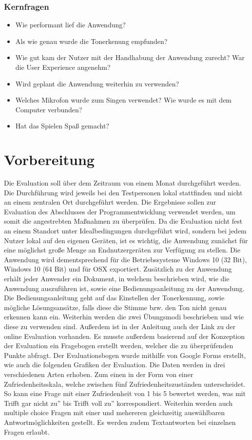 \subsubsection*{Kernfragen}
\begin{itemize}
    \item Wie performant lief die Anwendung?
    \item Als wie genau wurde die Tonerkenung empfunden?
    \item Wie gut kam der Nutzer mit der Handhabung der Anwendung zurecht? War die User Experience angenehm?
    \item Wird geplant die Anwendung weiterhin zu verwenden?
    \item Welches Mikrofon wurde zum Singen verwendet? Wie wurde es mit dem Computer verbunden?
    \item Hat das Spielen Spaß gemacht?
\end{itemize}

\section{Vorbereitung}
Die Evaluation soll über dem Zeitraum von einem Monat durchgeführt werden. Die Durchführung wird jeweils bei den Testpersonen lokal stattfinden und nicht an einem zentralen Ort durchgeführt werden. Die Ergebnisse sollen zur Evaluation des Abschlusses der Programmentwicklung verwendet werden, um somit die angestrebten Maßnahmen zu überprüfen. 
Da die Evaluation nicht fest an einem Standort unter Idealbedingungen durchgeführt wird, sondern bei jedem Nutzer lokal auf den eigenen Geräten, ist es wichtig, die Anwendung zunächst für eine möglichst große Menge an Endnutzergeräten zur Verfügung zu stellen. Die Anwendung wird dementsprechend für die Betriebssysteme Windows 10 (32 Bit), Windows 10 (64 Bit) und für OSX exportiert. Zusätzlich zu der Anwendung erhält jeder Anwender ein Dokument, in welchem beschrieben wird, wie die Anwendung auszuführen ist, sowie eine Bedienungsanleitung zu der Anwendung. Die Bedienungsanleitung geht auf das Einstellen der Tonerkennung, sowie mögliche Lösungsansätze, falls diese die Stimme bzw. den Ton nicht genau erkennen kann ein. Weiterhin werden die zwei Übungsmodi beschrieben und wie diese zu verwenden sind. Außerdem ist in der Anleitung auch der Link zu der online Evaluation vorhanden. Es musste außerdem basierend auf der Konzeption der Evaluation ein Fragebogen erstellt werden, welcher die zu überprüfenden Punkte abfragt. Der Evaluationsbogen wurde mithilfe von Google Forms erstellt, wie auch die folgenden Grafiken der Evaluation. Die Daten werden in drei verschiedenen Arten erhoben. Zum einen in der Form von einer Zufriedenheitsskala, welche zwischen fünf Zufriedenheitszuständen unterscheidet. So kann eine Frage mit einer Zufriedenheit von 1 bis 5 bewertet werden, was mit \glqq Trifft gar nicht zu'' bis \glqq Trifft voll zu'' korrespondiert. Weiterhin werden auch multiple choice Fragen mit einer und mehereren gleichzeitig auswählbaren Antwortmöglichkeiten gestellt. Es werden zudem Textantworten bei einzelnen Fragen erlaubt. 

